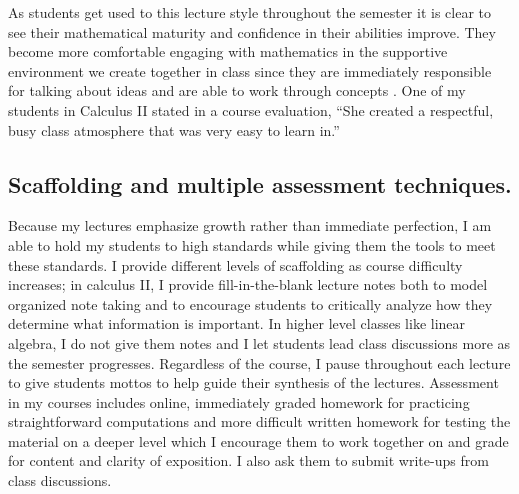 \documentclass[11pt]{amsart}
\theoremstyle{plain}
\theoremstyle{definition}
\theoremstyle{remark}
\begin{document}
As students get used to this lecture style throughout the semester it is clear to see their mathematical maturity and confidence in their abilities improve. They become more comfortable engaging with mathematics in the supportive environment we create together in class since they are immediately responsible for talking about ideas and are able to work through concepts . One of my students in Calculus II stated in a course evaluation, ``She created a respectful, busy class atmosphere that was very easy to learn in.'' 


\subsection*{Scaffolding and multiple assessment techniques.} Because my lectures emphasize growth rather than immediate perfection, I am able to hold my students to high standards while giving them the tools to meet these standards. I provide different levels of scaffolding as course difficulty increases; in calculus II, I provide fill-in-the-blank lecture notes both to model organized note taking and to encourage students to critically analyze how they determine what information is important. In higher level classes like linear algebra, I do not give them notes and I let students lead class discussions more as the semester progresses. Regardless of the course, I pause throughout each lecture to give students mottos to help guide their synthesis of the lectures. Assessment in my courses includes online, immediately graded homework for practicing straightforward computations and more difficult written homework for testing the material on a deeper level which I encourage them to work together on and grade for content and clarity of exposition. I also ask them to submit write-ups from class discussions. 
\end{document}
